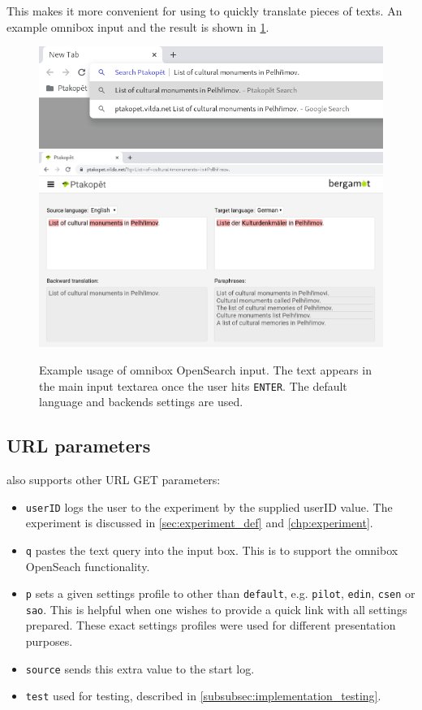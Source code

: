 This makes it more convenient for using \ptakopet{} to quickly translate pieces of texts. An example omnibox input and the result is shown in \cref{fig:usage-omnibox}.

\begin{figure}[ht]
  \centering
  \includegraphics[width=\textwidth]{img/usage/omnibox-opensearch-1.png}
  \text{}\vspace{0.5cm}
  \includegraphics[width=\textwidth]{img/usage/omnibox-opensearch-2.png}
  \caption{\label{fig:usage-omnibox} Example usage of omnibox OpenSearch input. The text appears in the main input textarea once the user hits \texttt{ENTER}. The default language and backends settings are used.}
\end{figure}

\pagebreak

\subsection*{URL parameters}

\ptakopet{} also supports other URL GET parameters:
\begin{itemize}
    \item \texttt{userID} logs the user to the experiment by the supplied userID value. The experiment is discussed in \cref{sec:experiment_def} and \cref{chp:experiment}.
    \item \texttt{q} pastes the text query into the input box. This is to support the omnibox OpenSeach functionality.
    \item \texttt{p} sets a given settings profile to other than \texttt{default}, e.g. \texttt{pilot}, \texttt{edin}, \texttt{csen} or \texttt{sao}. This is helpful when one wishes to provide a quick link with all settings prepared. These exact settings profiles were used for different presentation purposes.
    \item \texttt{source} sends this extra value to the start log.
    \item \texttt{test} used for testing, described in \cref{subsubsec:implementation_testing}.
\end{itemize}


